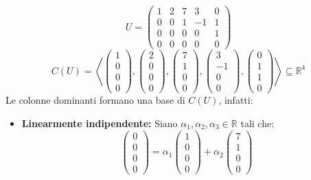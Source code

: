 \documentclass[a4paper]{article}
\theoremstyle{break}
\theoremstyle{break}
\theoremstyle{break}
\theoremstyle{break}
\begin{document}
\begin{example}
  \[
  U = \begin{pmatrix} 
    1 & 2 & 7 & 3 & 0 \\
    0 & 0 & 1 & -1 & 1 \\
    0 & 0 & 0 & 0 & 1 \\
    0 & 0 & 0 & 0 & 0
  \end{pmatrix} 
  \] 
  \[
  C(U) = \left< \begin{pmatrix} 1\\0\\0\\0 \end{pmatrix},
  \begin{pmatrix} 2\\0\\0\\0 \end{pmatrix},
  \begin{pmatrix} 7\\1\\0\\0 \end{pmatrix},
  \begin{pmatrix} 3\\-1\\0\\0 \end{pmatrix},
  \begin{pmatrix} 0\\1\\1\\0 \end{pmatrix}
\right> \subseteq \mathbb{R}^4
  \] 
  Le colonne dominanti formano una base di \( C(U) \), infatti:
  \begin{itemize}
    \item \textbf{Linearmente indipendente:} Siano \( \alpha_1, \alpha_2, \alpha_3 \in \mathbb{R} \) 
      tali che:
      \[
      \begin{pmatrix} 
        0\\
        0\\
        0\\
        0
      \end{pmatrix} 
      =
      \alpha_1 \begin{pmatrix} 1\\0\\0\\0 \end{pmatrix}
      +
      \alpha_2 \begin{pmatrix} 7\\1\\0\\0 \end{pmatrix}
\]
\end{itemize}
\end{example}
\end{document}
